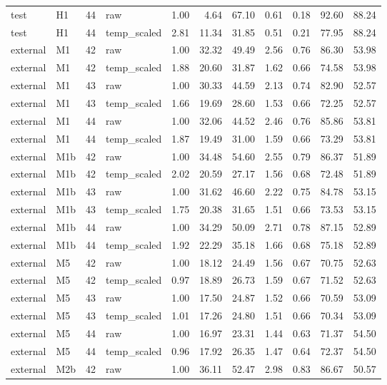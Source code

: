 \begin{tabular}{llrlrrrrrrr}
test & H1 & 44 & raw & 1.00 & 4.64 & 67.10 & 0.61 & 0.18 & 92.60 & 88.24 \\
test & H1 & 44 & temp\_scaled & 2.81 & 11.34 & 31.85 & 0.51 & 0.21 & 77.95 & 88.24 \\
external & M1 & 42 & raw & 1.00 & 32.32 & 49.49 & 2.56 & 0.76 & 86.30 & 53.98 \\
external & M1 & 42 & temp\_scaled & 1.88 & 20.60 & 31.87 & 1.62 & 0.66 & 74.58 & 53.98 \\
external & M1 & 43 & raw & 1.00 & 30.33 & 44.59 & 2.13 & 0.74 & 82.90 & 52.57 \\
external & M1 & 43 & temp\_scaled & 1.66 & 19.69 & 28.60 & 1.53 & 0.66 & 72.25 & 52.57 \\
external & M1 & 44 & raw & 1.00 & 32.06 & 44.52 & 2.46 & 0.76 & 85.86 & 53.81 \\
external & M1 & 44 & temp\_scaled & 1.87 & 19.49 & 31.00 & 1.59 & 0.66 & 73.29 & 53.81 \\
external & M1b & 42 & raw & 1.00 & 34.48 & 54.60 & 2.55 & 0.79 & 86.37 & 51.89 \\
external & M1b & 42 & temp\_scaled & 2.02 & 20.59 & 27.17 & 1.56 & 0.68 & 72.48 & 51.89 \\
external & M1b & 43 & raw & 1.00 & 31.62 & 46.60 & 2.22 & 0.75 & 84.78 & 53.15 \\
external & M1b & 43 & temp\_scaled & 1.75 & 20.38 & 31.65 & 1.51 & 0.66 & 73.53 & 53.15 \\
external & M1b & 44 & raw & 1.00 & 34.29 & 50.09 & 2.71 & 0.78 & 87.15 & 52.89 \\
external & M1b & 44 & temp\_scaled & 1.92 & 22.29 & 35.18 & 1.66 & 0.68 & 75.18 & 52.89 \\
external & M5 & 42 & raw & 1.00 & 18.12 & 24.49 & 1.56 & 0.67 & 70.75 & 52.63 \\
external & M5 & 42 & temp\_scaled & 0.97 & 18.89 & 26.73 & 1.59 & 0.67 & 71.52 & 52.63 \\
external & M5 & 43 & raw & 1.00 & 17.50 & 24.87 & 1.52 & 0.66 & 70.59 & 53.09 \\
external & M5 & 43 & temp\_scaled & 1.01 & 17.26 & 24.80 & 1.51 & 0.66 & 70.34 & 53.09 \\
external & M5 & 44 & raw & 1.00 & 16.97 & 23.31 & 1.44 & 0.63 & 71.37 & 54.50 \\
external & M5 & 44 & temp\_scaled & 0.96 & 17.92 & 26.35 & 1.47 & 0.64 & 72.37 & 54.50 \\
external & M2b & 42 & raw & 1.00 & 36.11 & 52.47 & 2.98 & 0.83 & 86.67 & 50.57 \\

\end{tabular}
